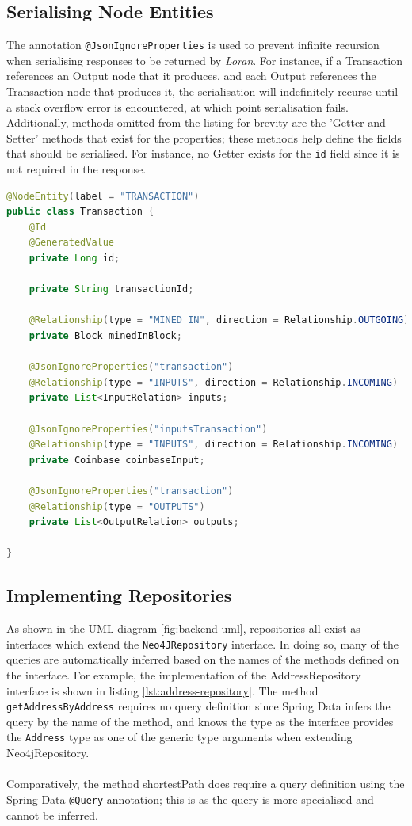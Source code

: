 \subsection{Serialising Node Entities}
The annotation \texttt{@JsonIgnoreProperties} is used to prevent infinite recursion when serialising responses to be returned by \textit{Loran}. For instance, if a Transaction references an Output node that it produces, and each Output references the Transaction node that produces it, the serialisation will indefinitely recurse until a stack overflow error is encountered, at which point serialisation fails. Additionally, methods omitted from the listing for brevity are the 'Getter and Setter' methods that exist for the properties; these methods help define the fields that should be serialised. For instance, no Getter exists for the \texttt{id} field since it is not required in the response. 

\begin{lstlisting}[language=Java, label={lst:node-entity-transaction}, caption={A transaction node entity}, breaklines=true, basicstyle=\small]
@NodeEntity(label = "TRANSACTION")
public class Transaction {
    @Id
    @GeneratedValue
    private Long id;

    private String transactionId;

    @Relationship(type = "MINED_IN", direction = Relationship.OUTGOING)
    private Block minedInBlock;

    @JsonIgnoreProperties("transaction")
    @Relationship(type = "INPUTS", direction = Relationship.INCOMING)
    private List<InputRelation> inputs;

    @JsonIgnoreProperties("inputsTransaction")
    @Relationship(type = "INPUTS", direction = Relationship.INCOMING)
    private Coinbase coinbaseInput;

    @JsonIgnoreProperties("transaction")
    @Relationship(type = "OUTPUTS")
    private List<OutputRelation> outputs;

}
\end{lstlisting}

\subsection{Implementing Repositories}
As shown in the UML diagram \ref{fig:backend-uml}, repositories all exist as interfaces which extend the \texttt{Neo4JRepository} interface. In doing so, many of the queries are automatically inferred based on the names of the methods defined on the interface. For example, the implementation of the AddressRepository interface is shown in listing \ref{lst:address-repository}. The method \texttt{getAddressByAddress} requires no query definition since Spring Data infers the query by the name of the method, and knows the type as the interface provides the \texttt{Address} type as one of the generic type arguments when extending Neo4jRepository. 
\\\\
Comparatively, the method shortestPath does require a query definition using the Spring Data \texttt{@Query} annotation; this is as the query is more specialised and cannot be inferred.

